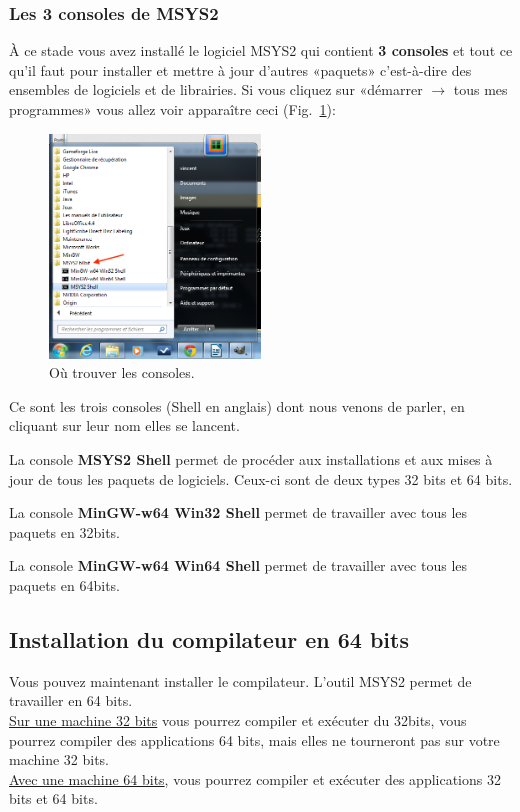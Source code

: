 \documentclass{article}
\newcommand\fig[1]{{Fig.~\ref{#1}}}
\begin{document}
\subsubsection{Les 3 consoles de MSYS2\label{S:3consoles}}
À ce stade vous avez installé le logiciel MSYS2 qui contient \textbf{3 consoles} et tout ce qu'il faut pour installer et mettre à jour d'autres «paquets» c'est-à-dire des ensembles de logiciels et de librairies. Si vous cliquez sur «démarrer $\rightarrow$ tous mes programmes» vous allez voir apparaître ceci (\fig{F:FindMsys2}):
\begin{figure}[H]
\center
\includegraphics[width=0.5\textwidth]{Plots/Msys2_10Start.png}
\caption{Où trouver les consoles.\label{F:FindMsys2}}
\end{figure}

Ce sont les trois consoles (Shell en anglais) dont nous venons de parler, en cliquant sur leur nom elles se lancent.  

La console {\color{Purple}\textbf{MSYS2 Shell}} permet de procéder aux installations et aux mises à jour de tous les paquets de logiciels. Ceux-ci sont de deux types 32 bits et 64 bits.

La console \textbf{MinGW-w64 Win32 Shell} permet de travailler avec tous les paquets en 32bits.

La console {\color{MidnightBlue}\textbf{MinGW-w64 Win64 Shell}} permet de travailler avec tous les paquets en 64bits.

\subsection{Installation du compilateur en 64 bits \label{S:compilateur64}}
Vous pouvez maintenant installer le compilateur. L'outil MSYS2 permet de travailler en 64 bits.\\\underline{Sur une machine 32 bits} vous pourrez compiler et exécuter du 32bits, vous pourrez compiler des applications 64 bits, mais elles ne tourneront pas sur votre machine 32 bits. \\\underline{Avec une machine 64 bits}, vous pourrez compiler et exécuter des applications 32 bits et 64 bits. 
\end{document}
